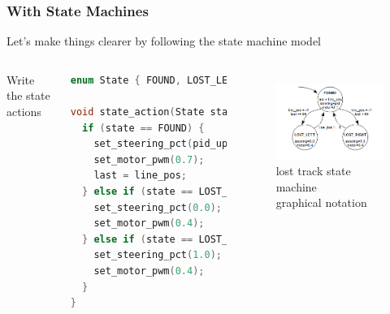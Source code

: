 \documentclass{beamer}
\begin{document}
\begin{frame}[fragile]
\frametitle{With State Machines}
Let's make things clearer by following the state machine model
\vspace{5px}
\begin{columns}[t]
Write the state actions
\begin{lstlisting}[language=C++,basicstyle=\ttfamily\tiny]
enum State { FOUND, LOST_LEFT, LOST_RIGHT };

void state_action(State state, int16_t line_pos, int16_t& last) {
  if (state == FOUND) {
    set_steering_pct(pid_update(line_pos));
    set_motor_pwm(0.7);
    last = line_pos;
  } else if (state == LOST_LEFT) {
    set_steering_pct(0.0);
    set_motor_pwm(0.4);
  } else if (state == LOST_RIGHT) {
    set_steering_pct(1.0);
    set_motor_pwm(0.4);
  }
}
\end{lstlisting}

\begin{figure}[h!]
\includegraphics[width=1.0\columnwidth]{images-dis10/statemachine} \\
lost track state machine \\
graphical notation
\end{figure}
\end{columns}
\end{frame}
\end{document}

